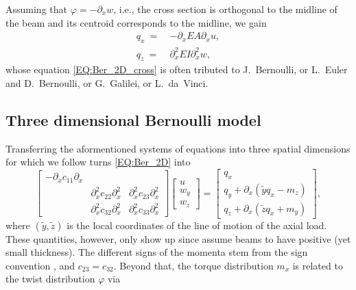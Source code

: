 \documentclass[a4paper, english, 12pt, reqno, draft]{amsart}
\theoremstyle{definition}
\theoremstyle{remark}
\numberwithin{equation}{section}
\newcommand{\longDef}{\ensuremath{u}}
\newcommand{\crossDef}{\ensuremath{w}}
\newcommand{\torsion}{\ensuremath{\varphi}}
\newcommand{\force}{\ensuremath{q}}
\newcommand{\momentum}{\ensuremath{m}}
\begin{document}
Assuming that $\torsion = - \partial_x \crossDef$, i.e., the cross section is orthogonal to the midline of the beam and its centroid corresponds to the midline, we gain
% 
\begin{subequations}\label{EQ:Ber_2D}
 \begin{align}
  \force_x ~=~ & - \partial_x  EA \partial_x \longDef, \label{EQ:beam_long_Ber}\\
  \force_z ~=~ & \partial_x^2 EI \partial_x^2 \crossDef, \label{EQ:Ber_2D_cross}
 \end{align}
\end{subequations}
% 
whose equation \eqref{EQ:Ber_2D_cross} is often tributed to J.~Bernoulli, or  L.~Euler and D.~Bernoulli, or G.~Galilei, or L.~da~Vinci.
% 
\subsection{Three dimensional Bernoulli model}
% 
Transferring the aformentioned systems of equations into three spatial dimensions for which we follow \cite[Sect.~6.1--6.4]{BauchauC2009} turns \eqref{EQ:Ber_2D} into
% 
\begin{equation}\label{EQ:Ber_3D}
 \begin{bmatrix}
  -\partial_x c_{11} \partial_x & & \\
  & \partial^2_x c_{22} \partial^2_x & \partial^2_x c_{23} \partial^2_x \\
  & \partial^2_x c_{32} \partial^2_x & \partial^2_x c_{33} \partial^2_x
 \end{bmatrix}
 \begin{bmatrix}
  \longDef \\ \crossDef_y \\ \crossDef_z
 \end{bmatrix}
 =
 \begin{bmatrix}
  \force_x \\ \force_y + \partial_x ( \tilde y \force_x - \momentum_z ) \\ \force_z + \partial_x ( \tilde z \force_x + \momentum_y )
 \end{bmatrix},
\end{equation}
% 
where $(\tilde y, \tilde z)$ is the local coordinates of the line of motion of the axial load. These quantities, however, only show up since \cite[Sect.~5--8]{BauchauC2009} assume beams to have positive (yet small thickness). The different signs of the momenta stem from the sign convention \cite[Sect.~5.2]{BauchauC2009}, and $c_{23} = c_{32}$. Beyond that, the torque distribution $\momentum_x$ is related to the twist distribution $\torsion$ via
\end{document}

